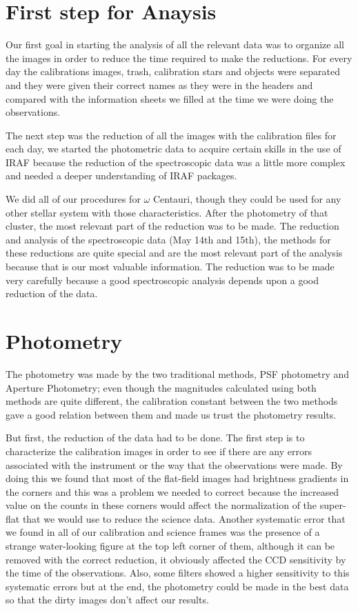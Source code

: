 \section{First step for Anaysis}

Our first goal in starting the analysis of all the relevant data was to organize all the images in order to reduce the time required to make the reductions. For every day the calibrations images, trash, calibration stars and objects were separated and they were given their correct names as they were in the headers and compared with the information sheets we filled at the time we were doing the observations.

The next step was the reduction of all the images with the calibration files for each day, we started the photometric data to acquire certain skills in the use of IRAF because the reduction of the spectroscopic data was a little more complex and needed a deeper understanding of IRAF packages. 

We did all of our procedures for $\omega$ Centauri, though they could be used for any other stellar system with those characteristics. After the photometry of that cluster, the most relevant part of the reduction was to be made. The reduction and analysis of the spectroscopic data (May 14th and 15th), the methods for these reductions are quite special and are the most relevant part of the analysis because that is our most valuable information. The reduction was to be made very carefully because a good spectroscopic analysis depends upon a good reduction of the data.

\section{Photometry}

The photometry was made by the two traditional methods, PSF photometry and Aperture Photometry; even though the magnitudes calculated using both methods are quite different, the calibration constant between the two methods gave a good relation between them and made us trust the photometry results.

But first, the reduction of the data had to be done. The first step is to characterize the calibration images in order to see if there are any errors associated with the instrument or the way that the observations were made. By doing this we found that most of the flat-field images had brightness gradients in the corners and this was a problem we needed to correct because the increased value on the counts in these corners would affect the normalization of the super-flat that we would use to reduce the science data. Another systematic error that we found in all of our calibration and science frames was the presence of a strange water-looking figure at the top left corner of them, although it can be removed with the correct reduction, it obviously affected the CCD sensitivity by the time of the observations. Also, some filters showed a higher sensitivity to this systematic errors but at the end, the photometry could be made in the best data so that the dirty images don't affect our results.

